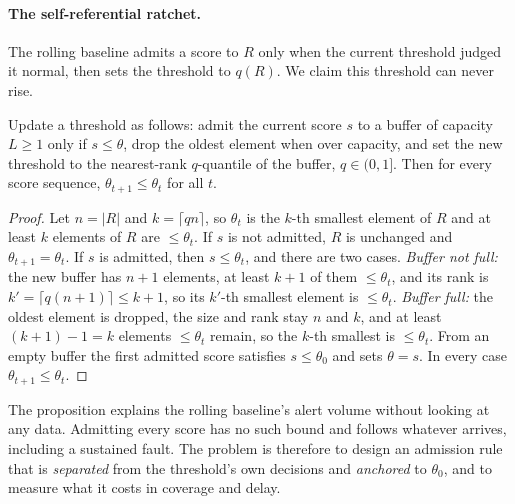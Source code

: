 \paragraph{The self-referential ratchet.}
The rolling baseline admits a score to $R$ only when the current threshold judged it
normal, then sets the threshold to $q(R)$. We claim this threshold can never rise.

\begin{proposition}\label{prop:ratchet}
Update a threshold as follows: admit the current score $s$ to a buffer of capacity
$L \ge 1$ only if $s \le \theta$, drop the oldest element when over capacity, and set
the new threshold to the nearest-rank $q$-quantile of the buffer, $q \in (0,1]$. Then
for every score sequence, $\theta_{t+1} \le \theta_t$ for all $t$.
\end{proposition}

\begin{proof}
Let $n=|R|$ and $k=\lceil qn \rceil$, so $\theta_t$ is the $k$-th smallest element of
$R$ and at least $k$ elements of $R$ are $\le \theta_t$. If $s$ is not admitted, $R$ is
unchanged and $\theta_{t+1}=\theta_t$. If $s$ is admitted, then $s \le \theta_t$, and
there are two cases. \emph{Buffer not full:} the new buffer has $n+1$ elements, at
least $k+1$ of them $\le \theta_t$, and its rank is
$k'=\lceil q(n+1)\rceil \le k+1$, so its $k'$-th smallest element is $\le \theta_t$.
\emph{Buffer full:} the oldest element is dropped, the size and rank stay $n$ and $k$,
and at least $(k+1)-1=k$ elements $\le \theta_t$ remain, so the $k$-th smallest is
$\le \theta_t$. From an empty buffer the first admitted score satisfies
$s \le \theta_0$ and sets $\theta = s$. In every case $\theta_{t+1} \le \theta_t$.
\end{proof}

The proposition explains the rolling baseline's alert volume without looking at any
data. Admitting every score has no such bound and follows whatever arrives, including a
sustained fault. The problem is therefore to design an admission rule that is
\emph{separated} from the threshold's own decisions and \emph{anchored} to $\theta_0$,
and to measure what it costs in coverage and delay.

